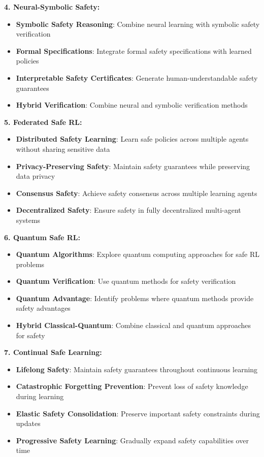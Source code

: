 \documentclass[12pt]{article}
\begin{document}
{{{{\textbf{4. Neural-Symbolic Safety:}
\begin{itemize}
\item \textbf{Symbolic Safety Reasoning}: Combine neural learning with symbolic safety verification
\item \textbf{Formal Specifications}: Integrate formal safety specifications with learned policies
\item \textbf{Interpretable Safety Certificates}: Generate human-understandable safety guarantees
\item \textbf{Hybrid Verification}: Combine neural and symbolic verification methods
\end{itemize}

\textbf{5. Federated Safe RL:}
\begin{itemize}
\item \textbf{Distributed Safety Learning}: Learn safe policies across multiple agents without sharing sensitive data
\item \textbf{Privacy-Preserving Safety}: Maintain safety guarantees while preserving data privacy
\item \textbf{Consensus Safety}: Achieve safety consensus across multiple learning agents
\item \textbf{Decentralized Safety}: Ensure safety in fully decentralized multi-agent systems
\end{itemize}

\textbf{6. Quantum Safe RL:}
\begin{itemize}
\item \textbf{Quantum Algorithms}: Explore quantum computing approaches for safe RL problems
\item \textbf{Quantum Verification}: Use quantum methods for safety verification
\item \textbf{Quantum Advantage}: Identify problems where quantum methods provide safety advantages
\item \textbf{Hybrid Classical-Quantum}: Combine classical and quantum approaches for safety
\end{itemize}

\textbf{7. Continual Safe Learning:}
\begin{itemize}
\item \textbf{Lifelong Safety}: Maintain safety guarantees throughout continuous learning
\item \textbf{Catastrophic Forgetting Prevention}: Prevent loss of safety knowledge during learning
\item \textbf{Elastic Safety Consolidation}: Preserve important safety constraints during updates
\item \textbf{Progressive Safety Learning}: Gradually expand safety capabilities over time
\end{itemize}

}}}}
\end{document}
